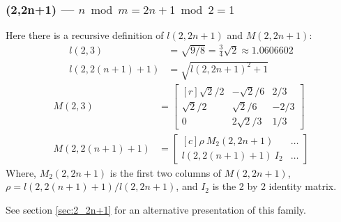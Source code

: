 \documentclass[12pt,titlepage]{article}
\begin{document}
\subsubsection{(2,2n+1) --- $n \bmod m = 2n+1 \bmod 2 = 1$}
Here there is a recursive definition of $l(2,2n+1)$ and $M(2,2n+1)$:
\begin{align*}
l(2,3)        &= \sqrt{9/8} 
               = \frac{3}{4} \sqrt{2} 
               \approx 1.0606602        \\
l(2,2(n+1)+1) &= \sqrt{l(2,2n+1)^2 + 1}
\end{align*}
\begin{align*}
M(2,3) &=
\begin{bmatrix*}[r]
\sqrt{2}/2 & -\sqrt{2}/6 &  2/3 \\
\sqrt{2}/2 &  \sqrt{2}/6 & -2/3 \\
0          & 2\sqrt{2}/3 &  1/3
\end{bmatrix*} \\
M(2,2(n+1)+1) &=
\begin{bmatrix*}[c]
\rho~M_2(2,2n+1)  & \ldots \\
l(2,2(n+1)+1)~I_2 & \ldots
\end{bmatrix*}
\end{align*}
Where, $M_2(2,2n+1)$ is the first two columns of $M(2,2n+1)$,
$\rho = l(2,2(n+1)+1)/l(2,2n+1)$, and $I_2$ is the 2 by 2 identity matrix.

See section \ref{sec:2_2n+1} for an alternative presentation of this family.
\end{document}

